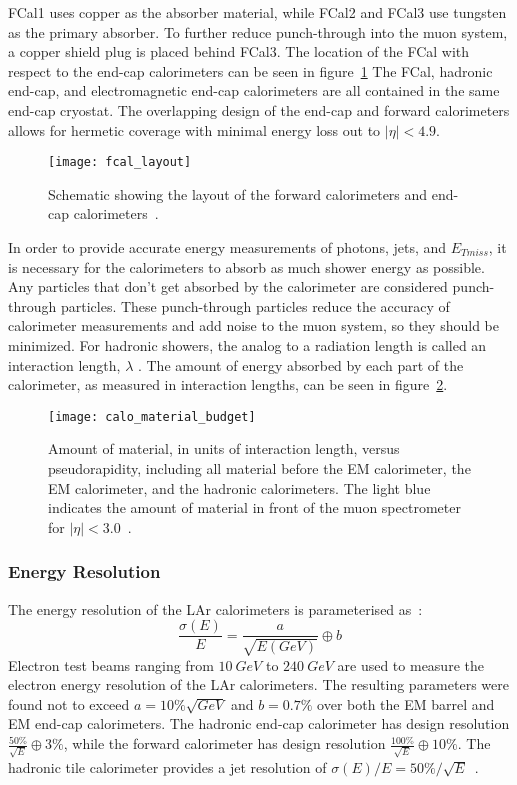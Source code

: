 FCal1 uses copper as the absorber material, while FCal2 and FCal3 use tungsten as the primary absorber.
To further reduce punch-through into the muon system, a copper shield plug is placed behind FCal3.
The location of the FCal with respect to the end-cap calorimeters can be seen in figure~\ref{fig:fcal_layout}
The FCal, hadronic end-cap, and electromagnetic end-cap calorimeters are all contained in the same end-cap cryostat.
The overlapping design of the end-cap and forward calorimeters allows for hermetic coverage with minimal energy loss out to $|\eta| < 4.9$.

\begin{figure}[!ht]\centering
\texttt{[image: fcal\_layout]}
\caption{Schematic showing the layout of the forward calorimeters and end-cap calorimeters~\cite{atlas-detector-2008}.}
\label{fig:fcal_layout}
\end{figure}

In order to provide accurate energy measurements of photons, jets, and $E_{Tmiss}$, it is necessary for the calorimeters to absorb as much shower energy as possible.
Any particles that don't get absorbed by the calorimeter are considered punch-through particles.
These punch-through particles reduce the accuracy of calorimeter measurements and add noise to the muon system, so they should be minimized.
For hadronic showers, the analog to a radiation length is called an interaction length, $\lambda$ .
The amount of energy absorbed by each part of the calorimeter, as measured in interaction lengths, can be seen in figure~\ref{fig:calo_material_budget}.

\begin{figure}[!ht]\centering
\texttt{[image: calo\_material\_budget]}
\caption{Amount of material, in units of interaction length, versus pseudorapidity, including all material before the EM calorimeter, the EM calorimeter, and the hadronic calorimeters.
The light blue indicates the amount of material in front of the muon spectrometer for $|\eta| < 3.0$~\cite{atlas-detector-2008}.}
\label{fig:calo_material_budget}
\end{figure}

\subsubsection{Energy Resolution}
The energy resolution of the LAr calorimeters is parameterised as~\cite{atlas-em-resolution}:
\begin{equation}
    \frac{\sigma(E)}{E} = \frac{a}{\sqrt{E(GeV)}}\oplus b
\end{equation}
Electron test beams ranging from $10~GeV$ to $240~GeV$ are used to measure the electron energy resolution of the LAr calorimeters.
The resulting parameters were found not to exceed $a=10\%\sqrt{GeV}$ and $b=0.7\%$ over both the EM barrel and EM end-cap calorimeters.
The hadronic end-cap calorimeter has design resolution $\frac{50\%}{\sqrt{E}}\oplus3\%$, while the forward calorimeter has design resolution $\frac{100\%}{\sqrt{E}}\oplus10\%$.
The hadronic tile calorimeter provides a jet resolution of $\sigma(E)/E = 50\%/\sqrt{E}$~\cite{atlas-detector-2008}.

